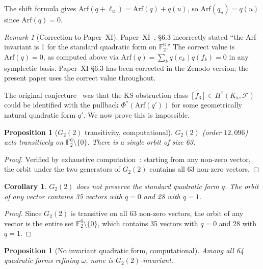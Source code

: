 \documentclass[11pt,a4paper]{article}
\newtheorem{corollary}[theorem]{Corollary}
\newtheorem{proposition}[theorem]{Proposition}
\theoremstyle{remark}
\newtheorem{remark}[theorem]{Remark}
\newcommand{\F}{\mathbb{F}}
\newcommand{\cF}{\mathcal{F}}
\begin{document}
The shift formula gives $\text{Arf}(q + \ell_u) = \text{Arf}(q) +
q(u)$, so $\text{Arf}(q_u) = q(u)$ since $\text{Arf}(q) = 0$.

\begin{remark}[Correction to Paper~XI]
\label{rem:paper-xi-correction}
Paper~XI~\cite{PaperXI}, \S6.3 incorrectly stated ``the Arf invariant
is 1 for the standard quadratic form on $\F_2^6$.'' The correct value
is $\text{Arf}(q) = 0$, as computed above via $\text{Arf}(q) = \sum_k
q(e_k)q(f_k) = 0$ in any symplectic basis. Paper~XI \S6.3 has been
corrected in the Zenodo version; the present paper uses the correct
value throughout.
\end{remark}

\medskip

The original conjecture~\cite{PaperIX} was that the KS obstruction
class $[f_3] \in H^1(K_5, \cF)$ could be identified with the pullback
$\Phi^*(\text{Arf}(q'))$ for some geometrically natural quadratic form
$q'$. We now prove this is impossible.

\begin{proposition}[$G_2(2)$ transitivity, computational]
\label{prop:transitive}
$G_2(2)$ (order $12{,}096$) acts transitively on $\F_2^6 \setminus
\{0\}$. There is a single orbit of size 63.
\end{proposition}

\begin{proof}
Verified by exhaustive computation~\cite{PaperXIIsuppl}: starting from
any non-zero vector, the orbit under the two generators of $G_2(2)$
contains all 63 non-zero vectors.
\end{proof}

\begin{corollary}
\label{cor:mixes-q}
$G_2(2)$ does not preserve the standard quadratic form $q$. The orbit
of any vector contains 35 vectors with $q = 0$ and 28 with $q = 1$.
\end{corollary}

\begin{proof}
Since $G_2(2)$ is transitive on all 63 non-zero vectors, the orbit of
any vector is the entire set $\F_2^6 \setminus \{0\}$, which contains
35 vectors with $q = 0$ and 28 with $q = 1$.
\end{proof}

\begin{proposition}[No invariant quadratic form, computational]
\label{prop:no-invariant-form}
Among all 64 quadratic forms refining $\omega$, none is
$G_2(2)$-invariant.
\end{proposition}
\end{document}
